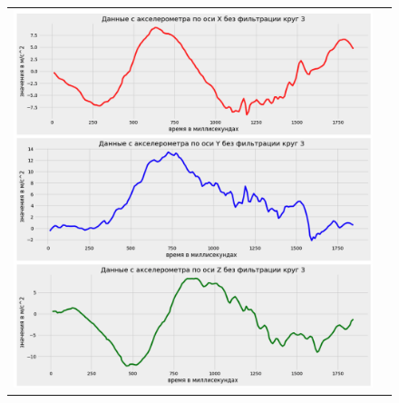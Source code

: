 \begin{figure}[H]
    \begin{center}
        \begin{tabular}{cc}
            \includegraphics[width=1\textwidth]{farim/im4.png} & 
        \end{tabular}
    \end{center}
\end{figure}


